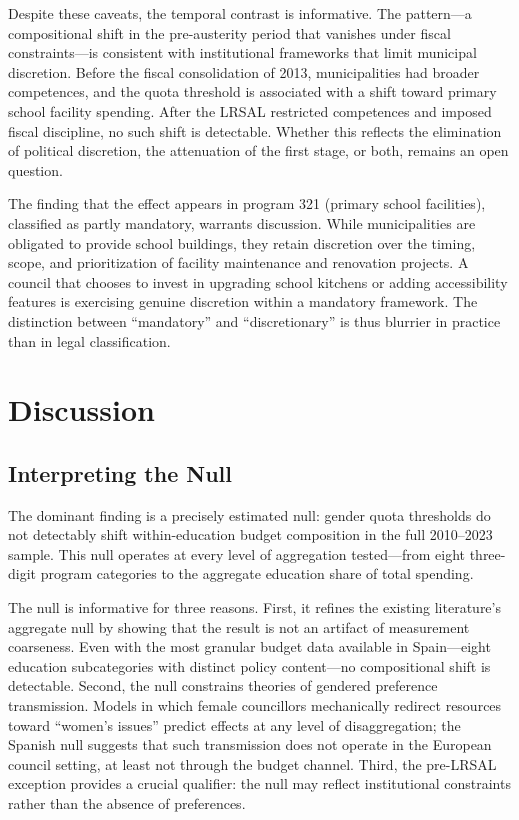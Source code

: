 \documentclass[12pt]{article}
\begin{document}
Despite these caveats, the temporal contrast is informative. The pattern---a compositional shift in the pre-austerity period that vanishes under fiscal constraints---is consistent with institutional frameworks that limit municipal discretion. Before the fiscal consolidation of 2013, municipalities had broader competences, and the quota threshold is associated with a shift toward primary school facility spending. After the LRSAL restricted competences and imposed fiscal discipline, no such shift is detectable. Whether this reflects the elimination of political discretion, the attenuation of the first stage, or both, remains an open question.

The finding that the effect appears in program 321 (primary school facilities), classified as partly mandatory, warrants discussion. While municipalities are obligated to provide school buildings, they retain discretion over the timing, scope, and prioritization of facility maintenance and renovation projects. A council that chooses to invest in upgrading school kitchens or adding accessibility features is exercising genuine discretion within a mandatory framework. The distinction between ``mandatory'' and ``discretionary'' is thus blurrier in practice than in legal classification.


\section{Discussion}

\subsection{Interpreting the Null}

The dominant finding is a precisely estimated null: gender quota thresholds do not detectably shift within-education budget composition in the full 2010--2023 sample. This null operates at every level of aggregation tested---from eight three-digit program categories to the aggregate education share of total spending.

The null is informative for three reasons. First, it refines the existing literature's aggregate null by showing that the result is not an artifact of measurement coarseness. Even with the most granular budget data available in Spain---eight education subcategories with distinct policy content---no compositional shift is detectable. Second, the null constrains theories of gendered preference transmission. Models in which female councillors mechanically redirect resources toward ``women's issues'' \citep{chattopadhyay2004women} predict effects at any level of disaggregation; the Spanish null suggests that such transmission does not operate in the European council setting, at least not through the budget channel. Third, the pre-LRSAL exception provides a crucial qualifier: the null may reflect institutional constraints rather than the absence of preferences.
\end{document}
